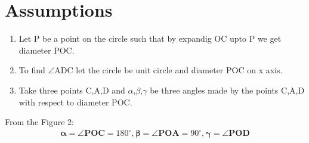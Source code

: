 \documentclass[12pt]{article}
\let\vec\mathbf
\begin{document}
\section*{\large Assumptions}
\begin{enumerate}
\item Let P be a point on the circle such that by expandig OC upto P we get diameter POC.
\item To find $\angle$ADC let the circle be unit circle and diameter POC on x axis.
\item Take three points C,A,D  and $\alpha$,$\beta$,$\gamma$ be three angles made by the points C,A,D with respect to diameter POC.
\end{enumerate}
From the Figure 2:
\begin{align}
\vec{\alpha} = \vec{\angle POC}= 180^\circ, 
\vec{\beta} = \vec{\angle POA} = 90^\circ,
\vec{\gamma} = \vec{\angle POD}
\end{align}
\end{document}
